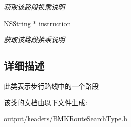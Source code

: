 \begin{DoxyCompactItemize}
\begin{DoxyCompactList}\small\item\em 获取该路段换乘说明 \end{DoxyCompactList}\item 
\hypertarget{interface_b_m_k_walking_step_ac55da8a1ca91a2b9d3bce4ddb711cf8e}{}N\+S\+String $\ast$ \hyperlink{interface_b_m_k_walking_step_ac55da8a1ca91a2b9d3bce4ddb711cf8e}{instruction}\label{interface_b_m_k_walking_step_ac55da8a1ca91a2b9d3bce4ddb711cf8e}

\begin{DoxyCompactList}\small\item\em 获取该路段换乘说明 \end{DoxyCompactList}\end{DoxyCompactItemize}


\subsection{详细描述}
此类表示步行路线中的一个路段 

该类的文档由以下文件生成\+:\begin{DoxyCompactItemize}
\item 
output/headers/B\+M\+K\+Route\+Search\+Type.\+h\end{DoxyCompactItemize}
